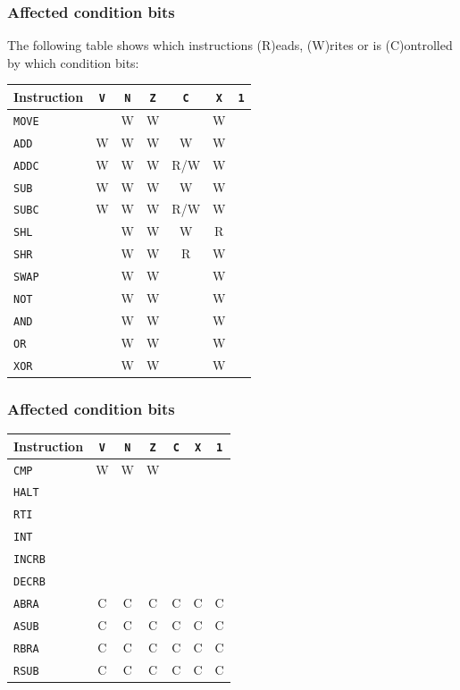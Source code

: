 \documentclass{beamer}
\begin{document}
   \begin{frame}
    \frametitle{Affected condition bits}
    The following table shows which instructions (R)eads, (W)rites or is 
    (C)ontrolled by which condition bits:
    \begin{center}
     \begin{tabular}{|l|c|c|c|c|c|c|}
      \hline
       Instruction&\texttt{V}&\texttt{N}&\texttt{Z}&\texttt{C}&\texttt{X}&\texttt{1}\\
      \hline
       \texttt{MOVE} & &W&W& &W& \\
       \texttt{ADD}  &W&W&W&W&W& \\
       \texttt{ADDC} &W&W&W&R/W&W& \\
       \texttt{SUB}  &W&W&W&W&W& \\
       \texttt{SUBC} &W&W&W&R/W&W& \\
       \texttt{SHL}  & &W&W&W&R& \\
       \texttt{SHR}  & &W&W&R&W& \\
       \texttt{SWAP} & &W&W& &W& \\
       \texttt{NOT}  & &W&W& &W& \\
       \texttt{AND}  & &W&W& &W& \\
       \texttt{OR}   & &W&W& &W& \\
       \texttt{XOR}  & &W&W& &W& \\
      \hline
     \end{tabular}
    \end{center}
   \end{frame}
%
   \begin{frame}
    \frametitle{Affected condition bits}
    \begin{center}
     \begin{tabular}{|l|c|c|c|c|c|c|}
      \hline
       Instruction&\texttt{V}&\texttt{N}&\texttt{Z}&\texttt{C}&\texttt{X}&\texttt{1}\\
      \hline
       \texttt{CMP}  &W&W&W& & & \\
       \texttt{HALT} & & & & & & \\
       \texttt{RTI}  & & & & & & \\
       \texttt{INT}  & & & & & & \\
       \texttt{INCRB}& & & & & & \\
       \texttt{DECRB}& & & & & & \\
       \texttt{ABRA} &C&C&C&C&C&C\\
       \texttt{ASUB} &C&C&C&C&C&C\\
       \texttt{RBRA} &C&C&C&C&C&C\\
       \texttt{RSUB} &C&C&C&C&C&C\\
      \hline
     \end{tabular}
    \end{center}
   \end{frame}
\end{document}
